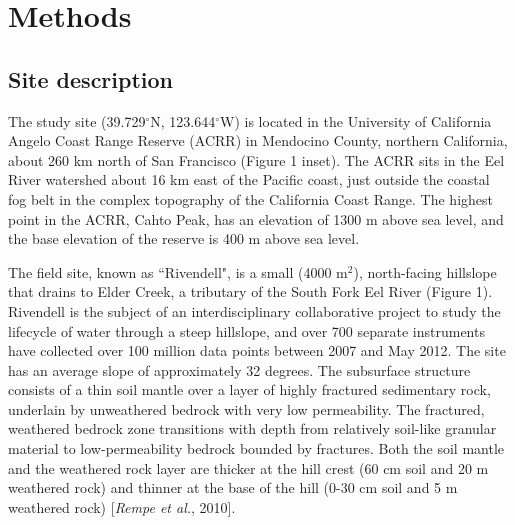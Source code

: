 \section{Methods}
\subsection{Site description}
The study site (39.729$^{\circ}$N, 123.644$^{\circ}$W) is located in the University of California Angelo Coast Range Reserve (ACRR) in Mendocino County, northern California, about 260 km north of San Francisco (Figure 1 inset).  The ACRR sits in the Eel River watershed about 16 km east of the Pacific coast, just outside the coastal fog belt in the complex topography of the California Coast Range. The highest point in the ACRR, Cahto Peak, has an elevation of 1300 m above sea level, and the base elevation of the reserve is 400 m above sea level.
	
The field site, known as ``Rivendell", is a small (4000 m$^2$), north-facing hillslope that drains to Elder Creek, a tributary of the South Fork Eel River (Figure 1).  Rivendell is the subject of an interdisciplinary collaborative project to study the lifecycle of water through a steep hillslope, and over 700 separate instruments have collected over 100 million data points between 2007 and May 2012.  The site has an average slope of approximately 32 degrees.  The subsurface structure consists of a thin soil mantle over a layer of highly fractured sedimentary rock, underlain by unweathered bedrock with very low permeability.  The fractured, weathered bedrock zone transitions with depth from relatively soil-like granular material to low-permeability bedrock bounded by fractures.  Both the soil mantle and the weathered rock layer are thicker at the hill crest (60 cm soil and 20 m weathered rock) and thinner at the base of the hill (0-30 cm soil and 5 m weathered rock) [\textit{Rempe et al.}, 2010].

